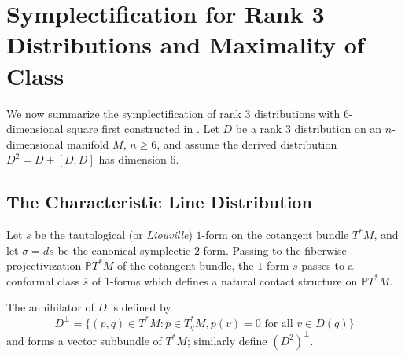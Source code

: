 \documentclass[11pt,letterpaper]{amsart}
\newcommand{\IZ}[1]{\todo[inline,color=red!40]{#1}}  %
\numberwithin{equation}{section}
\newcommand{\oline}{\overline}
\begin{document}

\section{Symplectification for Rank 3 Distributions and Maximality of Class}
\label{section: sympl}
We now summarize the symplectification of rank 3 distributions with $6$-dimensional square first constructed in \cite{doubrov2008rank3}. Let $D$ be a rank 3 distribution on an $n$-dimensional manifold $M$, $n\geq 6$, and assume the derived distribution $D^2=D + [D,D]$ has dimension $6$.

\subsection{The Characteristic Line Distribution}
\label{subsection:characteristic}
Let $s$ be the tautological (or \textit{Liouville}) $1$-form on the cotangent bundle $T^*M$, and let $\sigma = ds$ be the canonical symplectic $2$-form. Passing to the fiberwise projectivization $\mathbb{P}T^*M$ of the cotangent bundle, the $1$-form $s$ passes to a conformal class $\oline{s}$ of 1-forms which defines a natural contact structure on $\mathbb{P}T^*M$.

The annihilator of $D$ is defined by 
\begin{equation}
    D^\perp = \{(p,q)\in T^*M: p\in T_q^*M, p(v) = 0\text{ for all }v\in D(q)\}
\end{equation}
and forms a vector subbundle of $T^*M$; similarly define $(D^2)^\perp$. 
\end{document}
